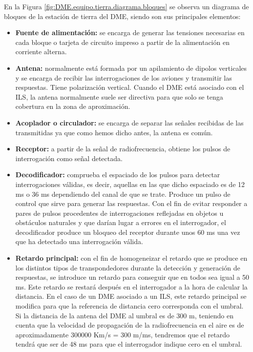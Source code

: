 En la Figura \ref{fig:DME.equipo.tierra.diagrama.bloques} se observa un  diagrama de bloques de la estaci\'on de tierra del DME, siendo son sus principales elementos:
\begin{itemize}
\item \textbf{Fuente de alimentaci\'on:} se encarga de generar las tensiones
  necesarias en cada bloque o tarjeta de circuito impreso a partir de
  la alimentaci\'on en corriente alterna.
\item \textbf{Antena: }normalmente est\'a
  formada por un apilamiento de dipolos verticales y se encarga de
  recibir las interrogaciones de los aviones y transmitir las
  respuestas. Tiene polarizaci\'on vertical. Cuando el DME est\'a asociado
  con el ILS, la antena normalmente suele ser directiva para que solo
  se tenga cobertura en la zona de aproximaci\'on.
\item \textbf{Acoplador o
  circulador:} se encarga de separar las se\~nales recibidas de las
  transmitidas ya que como hemos dicho antes, la antena es com\'un.

\item \textbf{Receptor:} a partir de la se\~nal de radiofrecuencia, obtiene los
  pulsos de interrogaci\'on como se\~nal detectada.
\item \textbf{Decodificador:}
  comprueba el espaciado de los pulsos para detectar interrogaciones
  v\'alidas, es decir, aquellas en las que dicho espaciado es de 12 ms o
  36 ms dependiendo del canal de que se trate. Produce un pulso de
  control que sirve para generar las respuestas. Con el fin de evitar
  responder a pares de pulsos procedentes de interrogaciones
  reflejadas en objetos u obst\'aculos naturales y que dar\'ian lugar a
  errores en el interrogador, el decodificador produce un bloqueo del
  receptor durante unos 60 ms una vez que ha detectado una
  interrogaci\'on v\'alida.
\item \textbf{ Retardo principal:} con el fin de homogeneizar
  el retardo que se produce en los distintos tipos de transpondedores
  durante la detecci\'on y generaci\'on de respuestas, se introduce un
  retardo para conseguir que en todos sea igual a 50 ms. Este retardo
  se restar\'a despu\'es en el interrogador a la hora de calcular la
  distancia. En el caso de un DME asociado a un ILS, este retardo
  principal se modifica para que la referencia de distancia cero
  corresponda con el umbral. Si la distancia de la antena del DME al
  umbral es de 300 m, teniendo en cuenta que la velocidad de
  propagaci\'on de la radiofrecuencia en el aire es de aproximadamente
  300000 Km/s = 300 m/ms, tendremos que el retardo tendr\'a que ser de
  48 ms para que el interrogador indique cero en el umbral.


\end{itemize}
